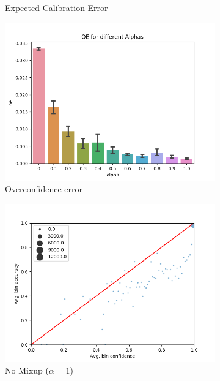 \begin{figure}[h]
\begin{subfigure}[b]{0.31\textwidth}
         \caption{Expected Calibration Error}
     \end{subfigure}
     \begin{subfigure}[b]{0.31\textwidth}
         \centering
         \includegraphics[width=\textwidth]{images/fmnist/oeValpha.png}
         \caption{Overconfidence error}
     \end{subfigure}
     \begin{subfigure}[b]{0.31\textwidth}
         \centering
         \noindent\includegraphics[width=\textwidth]{images/fmnist/scatterplot_0.png}
         \caption{No Mixup ($\alpha=1$)}
     \end{subfigure}
     \begin{subfigure}[b]{0.31\textwidth}

\end{subfigure}
\end{figure}
